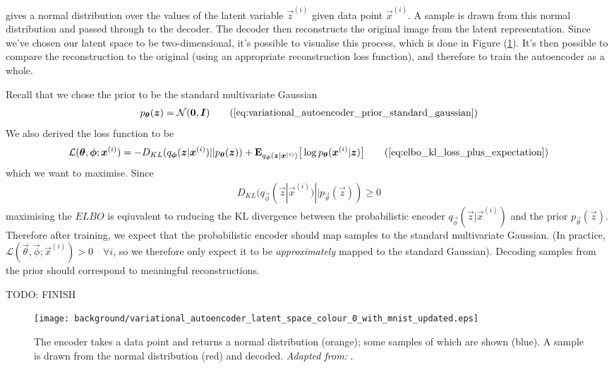 gives a normal distribution over the values of the latent variable $\vec{z}^{(i)}$ given data point $\vec{x}^{(i)}$. A sample is drawn from this normal distribution and passed through to the decoder. The decoder then reconstructs the original image from the latent representation. Since we've chosen our latent space to be two-dimensional, it's possible to visualise this process, which is done in Figure (\ref{fig:variational_autoencoder_latent_space_colour_0_with_mnist_updated}). It's then possible to compare the reconstruction to the original (using an appropriate reconstruction loss function), and therefore to train the autoencoder as a whole.

Recall that we chose the prior to be the standard multivariate Gaussian
\begin{align}
p_{\vec{\theta}}(\vec{z}) = \mathcal{N}(\vec{0}, \vec{I})
\tag{\ref{eq:variational_autoencoder_prior_standard_gaussian}}
\end{align}
We also derived the loss function to be
\begin{align}
\mathcal{L}(\vec{\theta}, \vec{\phi}; \vec{x}^{(i)}) = -D_{KL}(q_{\vec{\phi}}(\vec{z}|\vec{x}^{(i)}) || p_{\vec{\theta}}(\vec{z})) + \mathbf{E}_{q_{\vec{\phi}}(\vec{z}|\vec{x}^{(i)})}\big[\log p_{\vec{\theta}}(\vec{x}^{(i)} | \vec{z}) \big]
\tag{\ref{eq:elbo_kl_loss_plus_expectation}}
\end{align}
which we want to maximise. Since
\begin{align}
D_{KL}(q_{\vec{\phi}}(\vec{z}|\vec{x}^{(i)}) || p_{\vec{\theta}}(\vec{z})) \geq 0
\end{align}
maximising the $ELBO$ is eqiuvalent to ruducing the KL divergence between the probabilistic encoder $q_{\vec{\phi}}(\vec{z}|\vec{x}^{(i)})$ and the prior $p_{\vec{\theta}}(\vec{z})$. Therefore after training, we expect that the probabilistic encoder should map samples to the standard multivariate Gaussian. (In practice, $\mathcal{L}(\vec{\theta}, \vec{\phi}; \vec{x}^{(i)}) > 0 \quad \forall i$, so we therefore only expect it to be \textit{approximately} mapped to the standard Gaussian). Decoding samples from the prior should correspond to meaningful reconstructions.

TODO: FINISH

\begin{figure}[h!]
\centering
\captionsetup{justification=centering}
\texttt{[image: background/variational\_autoencoder\_latent\_space\_colour\_0\_with\_mnist\_updated.eps]}
\caption{The encoder takes a data point and returns a normal distribution (orange); some samples of which are shown (blue). A sample is drawn from the normal distribution (red) and decoded. \textit{Adapted from:} \cite{Dykeman2016}.}
\label{fig:variational_autoencoder_latent_space_colour_0_with_mnist_updated}
\end{figure}

